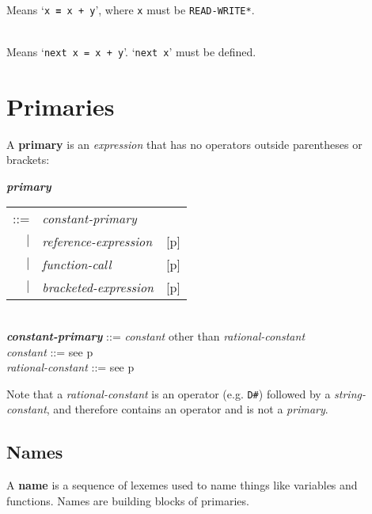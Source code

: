 \documentclass[12pt]{article}
\newcommand{\TT}[1]{{\tt \bfseries #1}}
\newcommand{\key}[1]{{\rm \bfseries #1}}
\newcommand{\emkey}[1]{{\em \bfseries #1}}
\newcommand{\pagref}[1]{p\pageref{#1}}
\newenvironment{indpar}[1][0.3in]%
	{\begin{list}{}%
		     {\setlength{\itemsep}{0in}%
		      \setlength{\topsep}{0in}%
		      \setlength{\parsep}{1ex}%
		      \setlength{\labelwidth}{#1}%
		      \setlength{\leftmargin}{#1}%
		      \addtolength{\leftmargin}{\labelsep}}%
	 \item}%
	{\end{list}}
\begin{document}
\begin{indpar}
\hspace*{-0.2in}{\tt x \TT{+=} y} \\
	Means `{\tt x \TT{=} x + y}', where {\tt x} must be {\tt *READ-WRITE*}.

\hspace*{-0.2in}{\tt next x \TT{+=} y} \\
	Means `{\tt next x = x + y}'.  `{\tt next x}' must be defined.
\end{indpar}

\section{Primaries}
\label{PRIMARIES}

A \key{primary} is an {\em expression} that has no operators outside
parentheses or brackets:
\begin{indpar}
\emkey{primary}
    \begin{tabular}[t]{@{}rll}
    ::= & {\em constant-primary} \\
    $|$ & {\em reference-expression}    & [\pagref{REFERENCE-EXPRESSIONS}] \\
    $|$ & {\em function-call}		& [\pagref{FUNCTION-CALLS}] \\
    $|$ & {\em bracketed-expression}	& [\pagref{BRACKETED-EXPRESSIONS}] \\
    \end{tabular}
\\[0.5ex]
\emkey{constant-primary} ::= {\em constant} other than {\em rational-constant}
\\[0.5ex]
{\em constant} ::= see \pagref{CONSTANTS}
\\[0.5ex]
{\em rational-constant} ::= see \pagref{RATIONAL-CONSTANTS}

\end{indpar}

Note that a {\em rational-constant} is an operator (e.g. {\tt D\#})
followed by a {\em string-constant}, and therefore contains an operator
and is not a {\em primary}.

\subsection{Names}
\label{NAMES}

A \key{name} is a sequence of lexemes used to name things like
variables and functions.  Names are building blocks of primaries.
\end{document}
